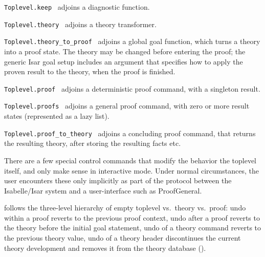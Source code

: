 \begin{isabellebody}
\begin{isamarkuptext}
\begin{description}
  \item \verb|Toplevel.keep|~ adjoins a diagnostic
  function.

  \item \verb|Toplevel.theory|~ adjoins a theory
  transformer.

  \item \verb|Toplevel.theory_to_proof|~ adjoins a global
  goal function, which turns a theory into a proof state.  The theory
  may be changed before entering the proof; the generic Isar goal
  setup includes an argument that specifies how to apply the proven
  result to the theory, when the proof is finished.

  \item \verb|Toplevel.proof|~ adjoins a deterministic
  proof command, with a singleton result.

  \item \verb|Toplevel.proofs|~ adjoins a general proof
  command, with zero or more result states (represented as a lazy
  list).

  \item \verb|Toplevel.proof_to_theory|~ adjoins a
  concluding proof command, that returns the resulting theory, after
  storing the resulting facts etc.

  \end{description}%
\end{isamarkuptext}%
\isamarkuptrue%
%
\endisatagmlref
{\isafoldmlref}%
%
\isadelimmlref
%
\endisadelimmlref
%
\isamarkuptrue%
%
\begin{isamarkuptext}%
There are a few special control commands that modify the behavior
  the toplevel itself, and only make sense in interactive mode.  Under
  normal circumstances, the user encounters these only implicitly as
  part of the protocol between the Isabelle/Isar system and a
  user-interface such as ProofGeneral.

  \begin{description}

  \item {} follows the three-level hierarchy of empty
  toplevel vs.\ theory vs.\ proof: undo within a proof reverts to the
  previous proof context, undo after a proof reverts to the theory
  before the initial goal statement, undo of a theory command reverts
  to the previous theory value, undo of a theory header discontinues
  the current theory development and removes it from the theory
  database ().


\end{description}
\end{isamarkuptext}
\end{isabellebody}
